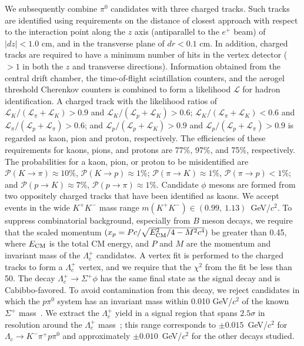 \documentclass[aps,prl,twocolumn,superscriptaddress,showpacs,preprintnumbers,amsmath,amssymb]{revtex4-1}
\begin{document}
We subsequently combine $\pi^0$ candidates with three charged tracks.
Such tracks  are identified using  requirements on the distance of closest approach with respect to the interaction point  along the $z$ axis (antiparallel to the $e^+$ beam) of $|dz|< 1.0$ cm, and in the transverse plane of $dr<0.1$  cm. In addition, charged tracks are required to have a minimum number of hits in the vertex detector ($>1$ in both  the  $z$ and transverse directions). Information obtained  from the central drift chamber, the time-of-flight scintillation counters, and the aerogel threshold Cherenkov counters is combined  to form a likelihood $\mathcal{L}$ for hadron identification. A charged track with the likelihood ratios of $\mathcal{L}_K/(\mathcal{L}_{\pi}+\mathcal{L}_K)> 0.9$ and $\mathcal{L}_K/(\mathcal{L}_{p}+\mathcal{L}_K) > 0.6$;  $\mathcal{L}_K/(\mathcal{L}_{\pi}+\mathcal{L}_K)<0.6$ and $\mathcal{L}_{\pi}/(\mathcal{L}_{p}+\mathcal{L}_{\pi}) > 0.6$; and  $\mathcal{L}_p/(\mathcal{L}_{p}+\mathcal{L}_K) > 0.9$ and $\mathcal{L}_p/(\mathcal{L}_{p}+\mathcal{L}_{\pi})> 0.9$ is regarded as kaon, pion and  proton, respectively. The  efficiencies of these requirements for kaons, pions, and protons are 77\%, 97\%, and 75\%, respectively. The probabilities for a kaon, pion, or proton to be misidentified  are $\mathcal{P}(K\to\pi)\approx10\%$, $\mathcal{P}(K\to p)\approx1\%$; $\mathcal{P}(\pi\to K)\approx1\%$, $\mathcal{P}(\pi\to p)<1\%$; and $\mathcal{P}(p\to K)\approx7\%$, $\mathcal{P}(p\to \pi)\approx1\%$.  Candidate $\phi$ mesons are formed from two oppositely charged tracks that have been identified as kaons. %
We accept events in the wide $K^+K^-$ mass range  $m(K^+K^-)\in(0.99,~1.13)$~GeV/$c^2$.
To suppress combinatorial background, especially from $B$ meson decays, we require that the scaled momentum $(x_p=Pc/\sqrt{E^2_{\rm CM}/4-M^2c^4})$  be greater than 0.45, where $E_{\rm CM}$ is the total CM energy, and $P$ and $M$ are the momentum and invariant mass of the $\Lambda_c^+$ candidates. 
A vertex fit is performed to the charged tracks to form a $\Lambda_c^+$ vertex, and we require that the $\chi^2$ from the fit be less than 50. The decay $\Lambda_c^+\to\Sigma^+\phi$ has the same final state as  the signal decay and is Cabibbo-favored. To avoid contamination from this decay, we reject candidates in which the $p\pi^0$ system has an invariant mass within 0.010 GeV/$c^2$ of the known $\Sigma^+$ mass~\cite{PDG}.
We extract the $\Lambda_c^+$ yield in a signal region that spans  $2.5\sigma$ in resolution %
around the $\Lambda_c^+$  mass~\cite{PDG}; this range corresponds to $\pm0.015$~GeV/$c^2$ for $\Lambda_c\to K^-\pi^+p\pi^0$  and approximately $\pm0.010$~GeV/$c^2$ for the other decays studied.
\end{document}
